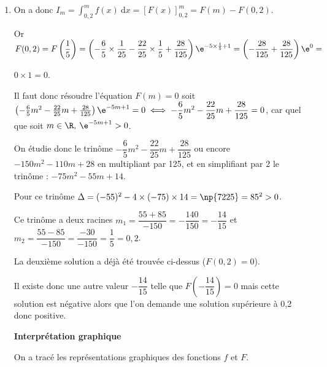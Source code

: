 \begin{enumerate}
\begin{enumerate}
$F'(x) = \left(- \dfrac{12}{5}x - \dfrac{22}{25} \right)\e^{-5x+ 1} - 5\left(-\dfrac65 x^2 - \dfrac{22}{25}x + \dfrac{28}{125}\right)\e^{-5x+ 1} =$

$ \e^{-5x+ 1}\left(- \dfrac{12}{5}x - \dfrac{22}{25} + 6x^2 + \dfrac{22}{5}x - \dfrac{28}{25}\right) = \left(6x^2 - \dfrac{10}{5}x - - \dfrac{50}{25}\right)\e^{-5x+ 1} =$

$ \left(6x^2 - 2x + 2\right)\e^{-5x+ 1} = f(x)$.

Sur $\R$, \: $F'(x)  = f(x)$ montre que $F$ est une primitive de la fonction $f$.
		\item %

On a donc $I_m = \displaystyle\int_{0,2}^m f(x)\:\text{d}x = \left[F(x) \right]_{0,2}^m = F(m) - F(0,2).$

Or $F(0,2) = F\left(\dfrac15\right) = \left(-\dfrac65 \times \dfrac{1}{25} - \dfrac{22}{25}\times \dfrac{1}{5} + \dfrac{28}{125}\right)\e^{-5\times \frac{1}{5}+ 1} = \left(- \dfrac{28}{125} + \dfrac{28}{125} \right)\e^{0} = $

$0 \times 1 = 0$.

Il faut donc résoudre l'équation $F(m) = 0$ soit $\left(-\frac65m^2 - \frac{22}{25}m + \frac{28}{125}\right)\e^{-5m+ 1} = 0 \iff -\dfrac65 m^2 - \dfrac{22}{25}m + \dfrac{28}{125} = 0$, car quel que soit $m \in \R , \:\e^{-5m+ 1} > 0$.

On étudie donc le trinôme $-\dfrac65 m^2 - \dfrac{22}{25}m + \dfrac{28}{125}$ ou encore $-150m^2 - 110m + 28$ en multipliant par 125, et en simplifiant par 2 le trinôme : $- 75m^2 - 55m + 14$.

Pour ce trinôme $\Delta = (- 55)^2 - 4 \times (- 75) \times 14 = \np{7225} = 85^2 > 0$.

Ce trinôme a deux racines $m_1 = \dfrac{55 + 85}{-150} = - \dfrac{140}{150} = - \dfrac{14}{15}$ et $m_2 = \dfrac{55 - 85}{-150} =  \dfrac{- 30}{-150} = \dfrac15 = 0,2$.

La deuxième solution a déjà été trouvée ci-dessus ($F(0,2) = 0$).

Il existe donc une autre valeur $- \dfrac{14}{15}$ telle que $F\left(- \dfrac{14}{15}\right) = 0$ mais cette solution est négative alors que l'on demande une solution supérieure à 0,2 donc positive.

\textbf{Interprétation graphique}

On a tracé les représentations graphiques des fonctions $f$ et $F$.


\end{enumerate}
\end{enumerate}
